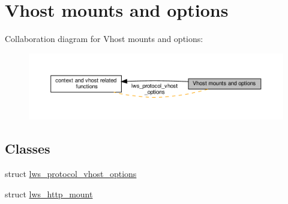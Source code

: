\hypertarget{group__vhost-mounts}{}\section{Vhost mounts and options}
\label{group__vhost-mounts}
Collaboration diagram for Vhost mounts and options\+:
\nopagebreak
\begin{figure}[H]
\begin{center}
\leavevmode
\includegraphics[width=350pt]{group__vhost-mounts}
\end{center}
\end{figure}
\subsection*{Classes}
\begin{DoxyCompactItemize}
\item 
struct \hyperlink{structlws__protocol__vhost__options}{lws\+\_\+protocol\+\_\+vhost\+\_\+options}
\item 
struct \hyperlink{structlws__http__mount}{lws\+\_\+http\+\_\+mount}
\end{DoxyCompactItemize}
